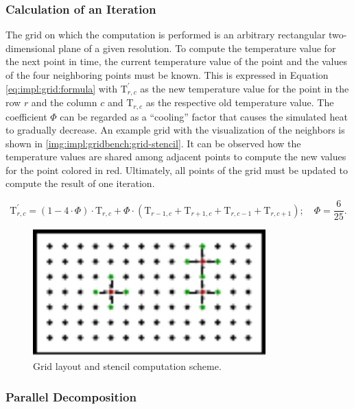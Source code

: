 \subsubsection*{Calculation of an Iteration}

The grid on which the computation is performed is an arbitrary rectangular two-dimensional plane of a given resolution. To compute the temperature value for the next point in time, the current temperature value of the point and the values of the four neighboring points must be known. This is expressed in Equation \eqref{eq:impl:grid:formula} with $\text{T}_{r,c}^{'}$ as the new temperature value for the point in the row $r$ and the column $c$ and $\text{T}_{r,c}$ as the respective old temperature value. The coefficient $\Phi$ can be regarded as a \enquote{cooling} factor that causes the simulated heat to gradually decrease. An example grid with the visualization of the neighbors is shown in \autoref{img:impl:gridbench:grid-stencil}. It can be observed how the temperature values are shared among adjacent points to compute the new values for the point colored in red. Ultimately, all points of the grid must be updated to compute the result of one iteration.

\begin{equation}
\label{eq:impl:grid:formula}
\text{T}_{r,c}^{'} = (1 - 4 \cdot \Phi) \cdot \text{T}_{r,c} + \Phi \cdot (\text{T}_{r-1,c} + \text{T}_{r+1,c} + \text{T}_{r,c - 1} + \text{T}_{r,c + 1} );\quad \Phi=\frac{6}{25}.
\end{equation}

\begin{figure}[htb]
\centering
\includegraphics[width=0.8\textwidth]{img/bench-grid-stencil}
\caption{Grid layout and stencil computation scheme.}
\label{img:impl:gridbench:grid-stencil}
\end{figure}

\subsubsection*{Parallel Decomposition}


